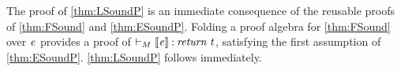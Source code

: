 The proof of \ref{thm:LSoundP} is an immediate consequence of the
reusable proofs of \ref{thm:FSound} and \ref{thm:ESoundP}. Folding a
proof algebra for \ref{thm:FSound} over \ensuremath{\Varid{e}} provides a proof of
$\vdash_M \llbracket \mathit{e}\rrbracket\mathbin{:}\mathit{return}\;\mathit{t}$, satisfying the first assumption of
\ref{thm:ESoundP}.  \ref{thm:LSoundP} follows immediately.


%
%
%
%



